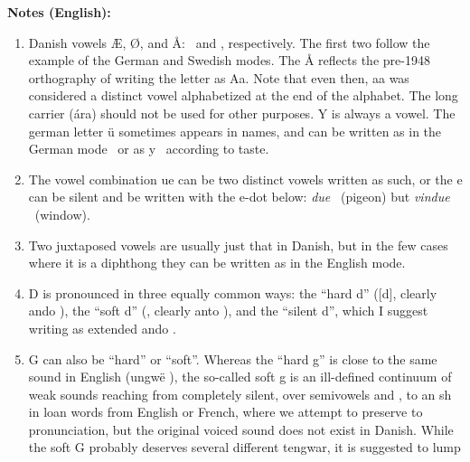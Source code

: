 \documentclass[a4paper]{article}
\begin{document}

\pagebreak
{\Large \textbf{Notes (English):}\par}

\begin{enumerate}
\item Danish vowels Æ, Ø, and Å: \Ttelco\TTinvertedthreedots\Ts
  \Ttelco\TTdoubleacute ~and \Taara\TTthreedots, respectively.  The
  first two follow the example of the German and Swedish modes.  The Å
  reflects the pre-1948 orthography of writing the letter as Aa.  Note
  that even then, aa was considered a distinct vowel alphabetized at
  the end of the alphabet.  The long carrier (\'ara) should not be
  used for other purposes.  Y is always a vowel.  The german letter
  \"u sometimes appears in names, and can be written as in the German
  mode \Ttelco\TTtwodots ~or as y \Ttelco\TTbreve ~according to
  taste.\label{notevokal}
\item The vowel combination ue can be two distinct vowels written as
  such, or the e can be silent and be written with the e-dot below: \emph{due}
  \Tando\Ttelco\TTleftcurl\Ttelco\TTacute ~(pigeon) but
  \emph{vindue}
  \Tampa\Tando\TTnasalizer\TTdot\Ttelco\TTleftcurl\TTdotbelow
  ~(window).
\item Two juxtaposed vowels are usually just that in Danish, but in
  the few cases where it is a diphthong they can be 
  written as in the English mode.
\item D is pronounced in three equally common ways: the ``hard d''
  ([d], clearly ando \Tando), the ``soft d'' (\textipa{[D]}, clearly anto \Tanto), and the
  ``silent d'', which I suggest writing as extended ando
  \Textendedando.\label{noteD}
\item G can also be ``hard'' or ``soft''.  Whereas the ``hard g'' is
  close to the same sound in English (ungw\"e \Tungwe), the so-called
  soft g is an ill-defined continuum of weak sounds reaching from
  completely silent, over semivowels \textipa{[I]} and \textipa{[U]},
  to an sh \textipa{[S]} in loan words from English or French, where
  we attempt to preserve to pronunciation, but the original voiced sound
  \textipa{[Z]} does not exist in Danish.  While the soft G
  probably deserves several different tengwar, it is suggested to lump

\end{enumerate}
\end{document}
